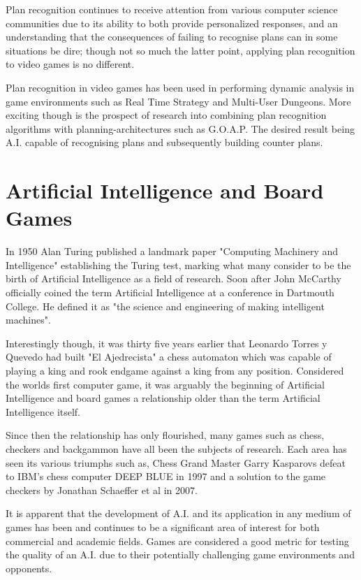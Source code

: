 \documentclass[parskip]{cs4rep}
\begin{document}
Plan recognition continues to receive attention from various computer science communities due to its ability to both provide personalized responses, and an understanding that the consequences of failing to recognise plans can in some situations be dire; though not so much the latter point, applying plan recognition to video games is no different.

Plan recognition in video games has been used in performing dynamic analysis in game environments such as Real Time Strategy \cite{conf/aiide/SynnaeveB11} and Multi-User Dungeons\cite{Albrecht:1998:BMK:598277.598308}. More exciting though is the prospect of research into combining plan recognition algorithms with planning-architectures such as G.O.A.P. The desired result being A.I. capable of recognising plans and subsequently building counter plans.

\section{Artificial Intelligence and Board Games}

In 1950 Alan Turing published a landmark paper "Computing Machinery and Intelligence" establishing the Turing test, marking what many consider to be the birth of Artificial Intelligence as a field of research. Soon after John McCarthy officially coined the term Artificial Intelligence at a conference in Dartmouth College. He defined it as "the science and engineering of making intelligent machines".

Interestingly though, it was thirty five years earlier that Leonardo Torres y Quevedo had built "El Ajedrecista" a chess automaton which was capable of playing a king and rook endgame against a king from any position. Considered the worlds first computer game, it was arguably the beginning of Artificial Intelligence and board games a relationship older than the term Artificial Intelligence itself. 

Since then the relationship has only flourished, many games such as chess, checkers and backgammon have all been the subjects of research. Each area has seen its various triumphs such as, Chess Grand Master Garry Kasparovs defeat to IBM's chess computer DEEP BLUE in 1997 and a solution to the game checkers by Jonathan Schaeffer et al in 2007.

It is apparent that the development of A.I. and its application in any medium of games has been and continues to be a significant area of interest for both commercial and academic fields. Games are considered a good metric for testing the quality of an A.I. due to their potentially challenging game environments and opponents.
\end{document}
